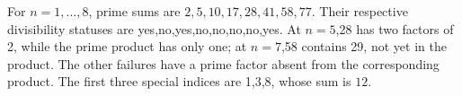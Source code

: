 For $n=1,\ldots,8$, prime sums are $2,5,10,17,28,41,58,77$. Their respective divisibility statuses are yes,no,yes,no,no,no,no,yes. At $n=5$,28 has two factors of 2, while the prime product has only one; at $n=7$,58 contains 29, not yet in the product. The other failures have a prime factor absent from the corresponding product. The first three special indices are 1,3,8, whose sum is $\boxed{12}$.
